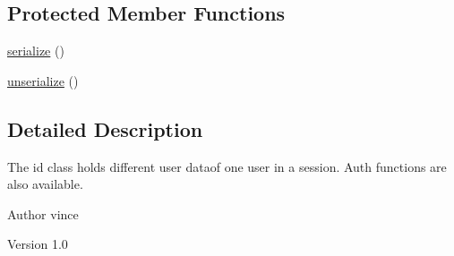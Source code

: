 \subsection*{Protected Member Functions}
\begin{DoxyCompactItemize}
\item 
\hyperlink{class_anemo_1_1_i_d_a4d9813fea8525b19a1d370eeb8fe41d6}{serialize} ()
\item 
\hyperlink{class_anemo_1_1_i_d_a22ab2c3304bb284dd641995a23592c03}{unserialize} ()
\end{DoxyCompactItemize}


\subsection{Detailed Description}
The id class holds different user dataof one user in a session. Auth functions are also available. \begin{DoxyAuthor}{Author}
vince 
\end{DoxyAuthor}
\begin{DoxyVersion}{Version}
1.0 
\end{DoxyVersion}


